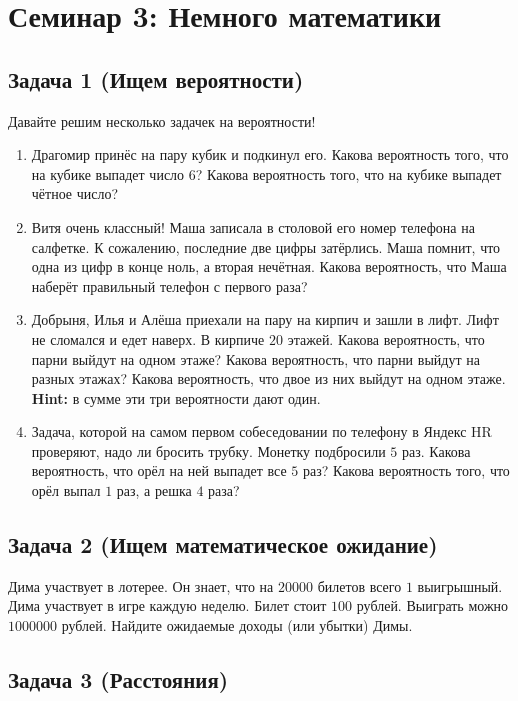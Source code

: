 \documentclass[12pt, a4paper, oneside]{article}
\begin{document}
	
\section*{Семинар 3: Немного математики}

\subsection*{Задача 1 (Ищем вероятности)}

Давайте решим несколько задачек на вероятности! 

\begin{enumerate}
\item  Драгомир принёс на пару кубик и подкинул его. Какова вероятность того, что на кубике выпадет число $6$? Какова вероятность того, что на кубике выпадет чётное число? 

\item  Витя очень классный! Маша записала в столовой его номер телефона на салфетке. К сожалению, последние две цифры затёрлись. Маша помнит, что одна из цифр в конце ноль, а вторая нечётная. Какова вероятность, что Маша наберёт правильный телефон с первого раза? 

\item  Добрыня, Илья и Алёша приехали на пару на кирпич и зашли в лифт. Лифт не сломался и едет наверх. В кирпиче $20$ этажей. Какова вероятность, что парни выйдут на одном этаже? Какова вероятность, что парни выйдут на разных этажах? Какова вероятность, что двое из них выйдут на одном этаже. \textbf{Hint:} в сумме эти три вероятности дают один. 

\item Задача, которой на самом первом собеседовании по телефону в Яндекс HR проверяют, надо ли бросить трубку.  Монетку подбросили $5$ раз. Какова вероятность, что орёл на ней выпадет все $5$ раз? Какова вероятность того, что орёл выпал $1$ раз, а решка $4$ раза?
\end{enumerate}

\subsection*{Задача 2 (Ищем математическое ожидание)}

Дима участвует в лотерее. Он знает, что на $20000$ билетов всего $1$ выигрышный. Дима участвует в игре каждую неделю. Билет стоит $100$ рублей. Выиграть можно $1000000$ рублей. Найдите ожидаемые доходы (или убытки) Димы. 


\subsection*{Задача 3 (Расстояния)}
\end{document}
